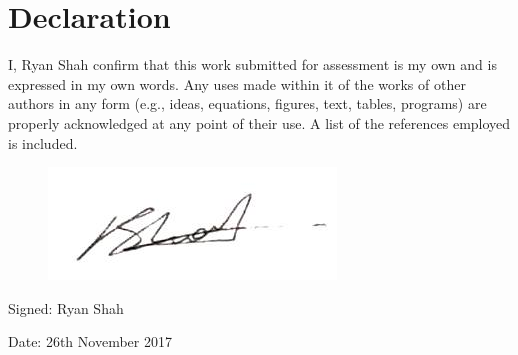 \chapter*{Declaration}
I, Ryan Shah confirm that this work submitted for assessment is my own and is expressed in my own words. Any uses made within it of the works of other authors in any form (e.g., ideas, equations, figures, text, tables, programs) are properly acknowledged at any point of their use. A list of the references employed is included.
\vspace{0.5cm}

\begin{figure}[h]
	\includegraphics[width=0.2\linewidth]{img/sig.jpg}
\end{figure}

\raggedright
\vspace{0.1cm}
Signed: Ryan Shah

\vspace{0.1cm}
Date: 26th November 2017
